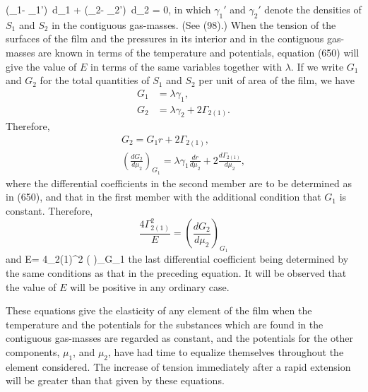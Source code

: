 \documentclass[12pt]{memoir}
\begin{document}
\eqs (\gamma_1- \gamma_1')\, d\mu_1 + (\gamma_2- \gamma_2')\, d\mu_2 = 0,   \label{651}\eqe
in which $\gamma_1'$ and $\gamma_2'$ denote the densities of $S_1$ and $S_2$ in the contiguous gas-masses. (See (98).) When the tension of the surfaces of the film and the pressures in its interior and in the contiguous gas-masses are known in terms of the temperature and potentials, equation (650) will give the value of $E$ in terms of the same variables together with $\lambda$.
If we write $G_1$  and $G_2$ for the total quantities of $S_1$ and $S_2$ per
unit of area of the film, we have
\begin{align}G_1&=\lambda \gamma_1,  \label{652} \\
G_2&= \lambda \gamma_2 + 2\Gamma_{2(1)}.    \label{653} \end{align}
Therefore,
\begin{gather}G_2 = G_1 r + 2\Gamma_{2(1)}, \nonumber \\
\left(\frac{dG_2}{d\mu_2} \right)_{G_1}= \lambda \gamma_1 \frac{dr}{d\mu_2} +2 \frac{d\Gamma_{2(1)}}{d\mu_2},   \label{654} \end{gather}
where the differential coefficients in the second member are to be determined as in (650), and that in the first member with the additional condition that $G_1$  is constant. Therefore,
$$\frac{4\Gamma_{2(1)}^2}{E}  = \left(\frac{dG_2}{d\mu_2} \right)_{G_1}$$
and
\eqs   E= 4\Gamma_{2(1)}^2  \left( \right)_{G_1}    \label{655} \eqe
the last differential coefficient being determined by the same conditions as that in the preceding equation. It will be observed that the value of $E$ will be positive in any ordinary case.

These equations give the elasticity of any element of the film when the temperature and the potentials for the substances which are found in the contiguous gas-masses are regarded as constant, and the potentials for the other components, $\mu_1$, and $\mu_2$, have had time to equalize themselves throughout the element considered. The increase of tension immediately after a rapid extension will be greater than that given by these equations.
\end{document}
